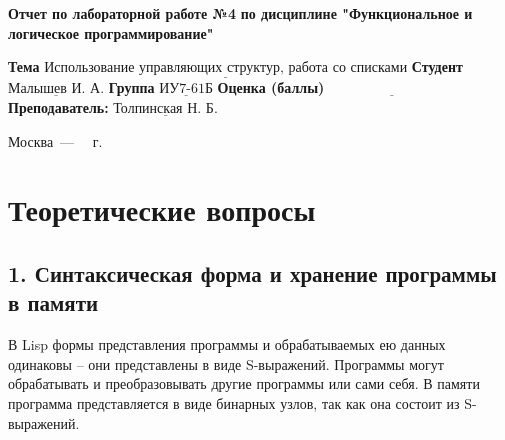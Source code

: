 \documentclass[12pt]{report}
\begin{document}
\begin{titlepage}
	
	\begin{center}
		\noindent\begin{minipage}{1.3\textwidth}\centering
			\Large\textbf{  Отчет по лабораторной работе №4}\newline
			\textbf{по дисциплине \newline "Функциональное и логическое программирование"}\newline\newline
		\end{minipage}
	\end{center}
	
	\noindent\textbf{Тема} $\underline{\text{Использование управляющих структур, работа со списками}}$\newline\newline
	\noindent\textbf{Студент} $\underline{\text{Малышев И. А.}}$\newline\newline
	\noindent\textbf{Группа} $\underline{\text{ИУ7-61Б}}$\newline\newline
	\noindent\textbf{Оценка (баллы)} $\underline{\text{~~~~~~~~~~~~~~~~~~~~~~~~~~~}}$\newline\newline
	\noindent\textbf{Преподаватель: } $\underline{\text{Толпинская Н. Б.}}$\newline\newline\newline
	
	\begin{center}
		\vfill
		Москва~---~\the\year
		~г.
	\end{center}
\end{titlepage}


\setcounter{page}{2}
\chapter*{Теоретические вопросы}

\section*{1. Синтаксическая форма и хранение программы в памяти}

В Lisp формы представления программы и обрабатываемых ею данных одинаковы – они представлены в виде S-выражений. Программы могут обрабатывать и преобразовывать другие программы или сами себя. В памяти программа представляется в виде бинарных узлов, так как она состоит из S-выражений.\newline
\end{document}
